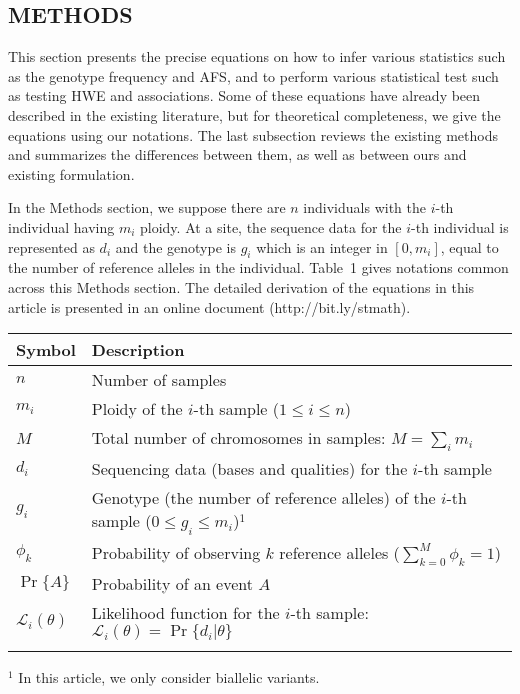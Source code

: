 \documentclass{bioinfo}
\begin{document}
\begin{methods}
\section{METHODS}
This section presents the precise equations on how to infer various statistics
such as the genotype frequency and AFS, and to perform various statistical test
such as testing HWE and associations. Some of these equations have already been
described in the existing literature, but for theoretical completeness, we give
the equations using our notations. The last subsection reviews the existing
methods and summarizes the differences between them, as well as between ours
and existing formulation.

In the Methods section, we suppose there are $n$ individuals with the $i$-th
individual having $m_i$ ploidy. At a site, the sequence data for the $i$-th
individual is represented as $d_i$ and the genotype is $g_i$ which is an
integer in $[0,m_i]$, equal to the number of reference alleles in the
individual.
Table~1 %
gives notations common across this Methods section. The detailed derivation of
the equations in this article is presented in an online document
(http://bit.ly/stmath).

\begin{table}[!htb]\label{tab:notation}
{\begin{tabular}{lp{7cm}}
\toprule
Symbol & Description \\
\midrule
$n$ & Number of samples \\
$m_i$ & Ploidy of the $i$-th sample ($1\le i\le n$)\\
$M$ & Total number of chromosomes in samples: $M=\sum_i m_i$\\
$d_i$ & Sequencing data (bases and qualities) for the $i$-th sample\\
$g_i$ & Genotype (the number of reference alleles) of the $i$-th sample \mbox{($0\le g_i\le m_i$)}$^1$\\
$\phi_k$ & Probability of observing $k$ reference alleles ($\sum_{k=0}^M\phi_k=1$) \\
$\Pr\{A\}$ & Probability of an event $A$\\
$\mathcal{L}_i(\theta)$ & Likelihood function for the $i$-th sample: $\mathcal{L}_i(\theta)=\Pr\{d_i|\theta\}$ \\
\botrule
\end{tabular}}{$^1$ In this article, we only consider biallelic variants.}
\end{table}


\end{methods}
\end{document}
